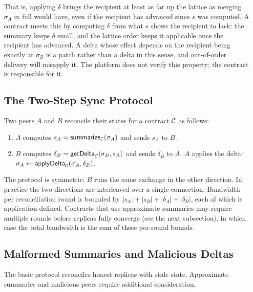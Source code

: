 \noindent That is, applying $\delta$ brings the recipient at least as far up the lattice as merging $\sigma_A$ in full would have, even if the recipient has advanced since $s$ was computed. A contract meets this by computing $\delta$ from what $s$ shows the recipient to lack: the summary keeps $\delta$ small, and the lattice order keeps it applicable once the recipient has advanced. A delta whose effect depends on the recipient being exactly at $\sigma_B$ is a patch rather than a delta in this sense, and out-of-order delivery will misapply it. The platform does not verify this property; the contract is responsible for it.

\subsection{The Two-Step Sync Protocol}



Two peers $A$ and $B$ reconcile their states for a contract $\mathcal{C}$ as follows:

\begin{enumerate}[leftmargin=1.4em, itemsep=2pt]
  \item $A$ computes $s_A = \mathsf{summarize}_{\mathcal{C}}(\sigma_A)$ and sends $s_A$ to $B$.
  \item $B$ computes $\delta_B = \mathsf{getDelta}_{\mathcal{C}}(\sigma_B, s_A)$ and sends $\delta_B$ to $A$. $A$ applies the delta: $\sigma_A \gets \mathsf{applyDelta}_{\mathcal{C}}(\sigma_A, \delta_B)$.
\end{enumerate}

The protocol is symmetric: $B$ runs the same exchange in the other direction. In practice the two directions are interleaved over a single connection. Bandwidth per reconciliation round is bounded by $|s_A| + |s_B| + |\delta_A| + |\delta_B|$, each of which is application-defined. Contracts that use approximate summaries may require multiple rounds before replicas fully converge (see the next subsection), in which case the total bandwidth is the sum of these per-round bounds.

\subsection{Malformed Summaries and Malicious Deltas}

The basic protocol reconciles honest replicas with stale state. Approximate summaries and malicious peers require additional consideration.

